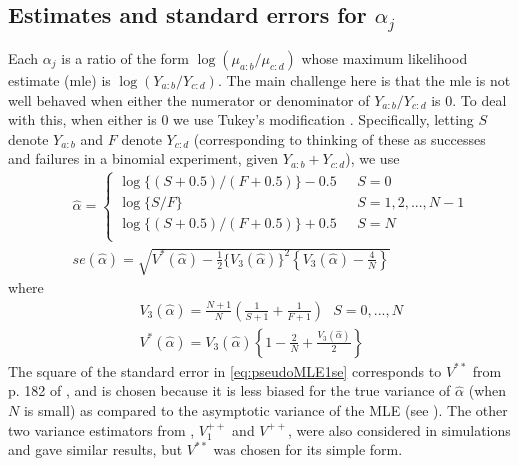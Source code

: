 \documentclass[12pt]{article}
\newcommand{\Ga}{\alpha}
\begin{document}
\begin{appendices}
\subsection{Estimates and standard errors for $\alpha_j$}

Each $\alpha_{j}$ is a ratio of the form $\log(\mu_{a:b}/\mu_{c:d})$ whose maximum likelihood estimate (mle) is $\log(Y_{a:b}/Y_{c:d})$. The main challenge here is that the mle is not well behaved when either the numerator or denominator of $Y_{a:b}/Y_{c:d}$ is 0. To deal with this, when either is 0 we use Tukey's modification \cite{Gart1967Bias}. Specifically, letting $S$ denote $Y_{a:b}$ and $F$ denote $Y_{c:d}$ (corresponding to thinking of these as successes and failures in a binomial experiment, given $Y_{a:b}+Y_{c:d}$), we use
\begin{eqnarray}\label{eq:pseudoMLE1}
&&\hat{\Ga}=\left\{
\begin{array}{lll}
\log\{(S+0.5)/(F+0.5)\}-0.5&\ \ \ S=0\\
\log\{S/F\}&\ \ \ S=1,2,...,N-1\\
\log\{(S+0.5)/(F+0.5)\}+0.5&\ \ \ S=N\\
\end{array}
\right.\\ \label{eq:pseudoMLE1se}
&&se(\hat{\Ga})=\sqrt{V^*(\hat{\Ga})-\frac{1}{2}\{V_3(\hat{\Ga})\}^2\left\{V_3(\hat{\Ga})-\frac{4}{N}\right\}}
\end{eqnarray}
where
\begin{eqnarray}
&&V_3(\hat{\Ga})=\frac{N+1}{N}\left(\frac{1}{S+1}+\frac{1}{F+1}\right)\ \ \ S=0,...,N\\
\label{eq:pseudoMLE2}&&V^*(\hat{\Ga})=V_3(\hat{\Ga})\left\{1-\frac{2}{N}+\frac{V_3(\hat{\Ga})}{2}\right\}
\end{eqnarray}
The square of the standard error in \eqref{eq:pseudoMLE1se} corresponds to $V^{\ast\ast}$ from p. 182 of \cite{Gart1967Bias}, and is chosen because it is less biased for the true variance of $\hat{\Ga}$ (when $N$ is small) as compared to the asymptotic variance of the MLE (see \cite{Gart1967Bias}). The other two variance estimators from \cite{Gart1967Bias}, $V_1^{++}$ and $V^{++}$, were also considered in simulations and gave similar results, but $V^{\ast\ast}$ was chosen for its simple form.




\end{appendices}
\end{document}
